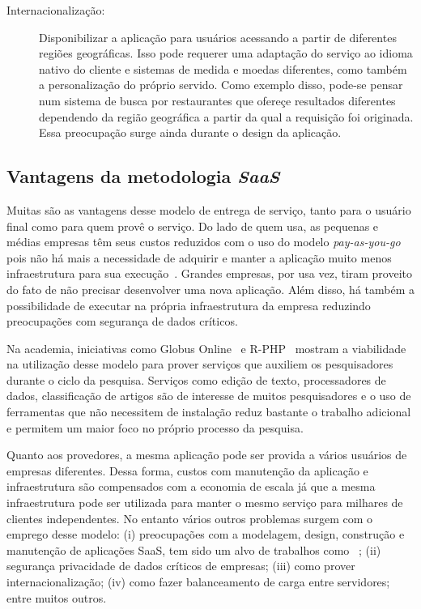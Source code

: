 \documentclass[a4paper,titlepage,12pt]{article}
\begin{document}
\begin{description}
    \item[Internacionalização:] Disponibilizar a aplicação para usuários acessando a partir de diferentes regiões geográficas. Isso pode requerer uma adaptação do serviço ao idioma nativo do cliente e sistemas de medida e moedas diferentes, como também a personalização do próprio servido. Como exemplo disso, pode-se pensar num sistema de busca por restaurantes que ofereçe resultados diferentes dependendo da região geográfica a partir da qual a requisição foi originada. Essa preocupação surge ainda durante o design da aplicação.
\end{description}

\subsection{Vantagens da metodologia \textit{SaaS}}

Muitas são as vantagens desse modelo de entrega de serviço, tanto para o usuário final como para quem provê o serviço. Do lado de quem usa, as pequenas e médias empresas têm seus custos reduzidos com o uso do modelo \textit{pay-as-you-go} pois não há mais a necessidade de adquirir e manter a aplicação muito menos infraestrutura para sua execução~\cite{saas-small-medium-enterprise}. Grandes empresas, por usa vez, tiram proveito do fato de não precisar desenvolver uma nova aplicação. Além disso, há também a possibilidade de executar na própria infraestrutura da empresa reduzindo preocupações com segurança de dados críticos.

Na academia, iniciativas como Globus Online~\cite{globus-online} e R-PHP~\cite{r-php} mostram a viabilidade na utilização desse modelo para prover serviços que auxiliem os pesquisadores durante o ciclo da pesquisa. Serviços como edição de texto, processadores de dados, classificação de artigos são de interesse de muitos pesquisadores e o uso de ferramentas que não necessitem de instalação reduz bastante o trabalho adicional e permitem um maior foco no próprio processo da pesquisa.

Quanto aos provedores, a mesma aplicação pode ser provida a vários usuários de empresas diferentes. Dessa forma, custos com manutenção da aplicação e infraestrutura são compensados com a economia de escala já que a mesma infraestrutura pode ser utilizada para manter o mesmo serviço para milhares de clientes independentes. No entanto vários outros problemas surgem com o emprego desse modelo: (i) preocupações com a modelagem, design, construção e manutenção de aplicações SaaS, tem sido um alvo de trabalhos como ~\cite{software-modeling,software-development}; (ii) segurança privacidade de dados críticos de empresas; (iii) como prover internacionalização; (iv) como fazer balanceamento de carga entre servidores; entre muitos outros. 
\end{document}
